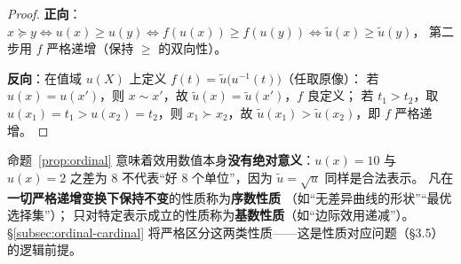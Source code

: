 \begin{proof}
\textbf{正向}：$x\succeq y\iff u(x)\ge u(y)\iff f(u(x))\ge f(u(y))\iff \tilde u(x)\ge \tilde u(y)$，
第二步用 $f$ 严格递增（保持 $\ge$ 的双向性）。

\textbf{反向}：在值域 $u(X)$ 上定义 $f(t)=\tilde u\bigl(u^{-1}(t)\bigr)$（任取原像）：
若 $u(x)=u(x')$，则 $x\sim x'$，故 $\tilde u(x)=\tilde u(x')$，$f$ 良定义；
若 $t_1>t_2$，取 $u(x_1)=t_1>u(x_2)=t_2$，则 $x_1\succ x_2$，故 $\tilde u(x_1)>\tilde u(x_2)$，即 $f$ 严格递增。
\end{proof}

\begin{remark}[序数性质与基数性质]\label{rem:cardinal}
命题~\ref{prop:ordinal} 意味着效用数值本身\textbf{没有绝对意义}：$u(x)=10$ 与 $u(x)=2$ 之差为 $8$
不代表“好 8 个单位”，因为 $\tilde u=\sqrt{u}$ 同样是合法表示。
凡在\textbf{一切严格递增变换下保持不变}的性质称为\textbf{序数性质}
（如“无差异曲线的形状”“最优选择集”）；
只对特定表示成立的性质称为\textbf{基数性质}（如“边际效用递减”）。
§\ref{subsec:ordinal-cardinal} 将严格区分这两类性质——这是性质对应问题（§3.5）的逻辑前提。
\end{remark}

